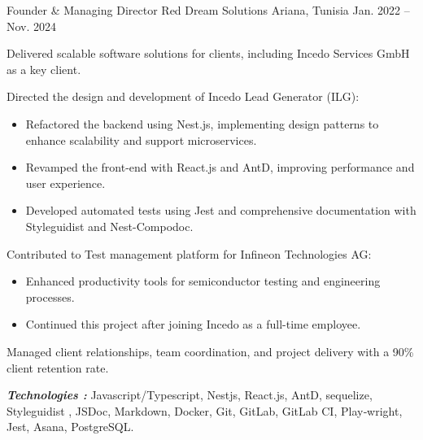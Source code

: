 \begin{cventries}
  \cventry
    {Founder \& Managing Director} %
    {Red Dream Solutions} %
    {Ariana, Tunisia} %
    {Jan. 2022 – Nov. 2024} %
    {
      \begin{cvitems} %
        \item {Delivered scalable software solutions for clients, including Incedo Services GmbH as a key client.}
        \item {Directed the design and development of Incedo Lead Generator (ILG):
        \begin{itemize}
          \item{Refactored the backend using Nest.js, implementing design patterns
          to enhance scalability and support microservices.}
          \item{Revamped the front-end with React.js and AntD, improving performance and user experience.}
          \item{Developed automated tests using Jest and comprehensive documentation with Styleguidist and Nest-Compodoc.}
        \end{itemize}
        }
        \item {Contributed to Test management platform for Infineon Technologies AG:
          \begin{itemize}
            \item{Enhanced productivity tools for semiconductor testing and engineering processes.}
            \item{Continued this project after joining Incedo as a full-time employee.}
          \end{itemize}
        }
        \item {Managed client relationships, team coordination, and project delivery with a 90\% client retention rate.}
       \end{cvitems}
       \vspace{5mm}
      \textbf{\textit{Technologies :}} Javascript/Typescript, Nestjs, React.js, AntD, sequelize, Styleguidist ,
       JSDoc, Markdown, Docker, Git, GitLab, GitLab CI, Play‐wright, Jest, Asana, PostgreSQL.
      \vspace{5mm}
    }


\end{cventries}
